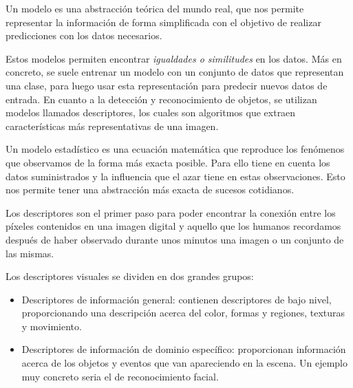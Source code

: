 \begin{definition}[Modelo]
Un modelo es una abstracción teórica del mundo real, que nos permite representar la información de forma simplificada con el objetivo de realizar predicciones con los datos necesarios. 
\end{definition}

Estos modelos permiten encontrar \textit{igualdades o similitudes} en los datos. Más en concreto, se suele entrenar un modelo con un conjunto de datos que representan una clase, para luego usar esta representación para predecir nuevos datos de entrada. En cuanto a la detección y reconocimiento de objetos, se utilizan modelos llamados descriptores, los cuales son algoritmos que extraen características más representativas de una imagen. 

\begin{definition}\label{def:mod_est}
Un modelo estadístico es una ecuación matemática que reproduce los fenómenos que observamos de la forma más exacta posible. Para ello tiene en cuenta los datos suministrados y la influencia que el azar tiene en estas observaciones. Esto nos permite tener una abstracción más exacta de sucesos cotidianos.
\end{definition}
 
\begin{definition}[Descriptor]\label{def:desc}
Los descriptores son el primer paso para poder encontrar la conexión entre los píxeles contenidos en una imagen digital y aquello que los humanos recordamos después de haber observado durante unos minutos una imagen o un conjunto de las mismas.

Los descriptores visuales se dividen en dos grandes grupos:
\begin{itemize}
\item Descriptores de información general: contienen descriptores de bajo nivel, proporcionando una descripción acerca del color, formas y regiones, texturas y movimiento.
\item Descriptores de información de dominio específico: proporcionan información acerca de los objetos y eventos que van apareciendo en la escena. Un ejemplo muy concreto seria el de reconocimiento facial.
\end{itemize}

\end{definition}


